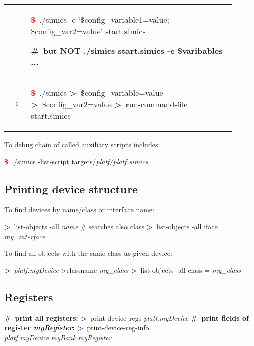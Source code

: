\documentclass[8pt]{extarticle}
\newenvironment{code}[1][]{%
\begin{prebox}[#1]\obeylines}{%
\end{prebox}}
\newenvironment{codem}[1][\linewidth]{%
\begin{minipage}{#1}%
\begin{prebox}\obeylines}{%
\end{prebox}%
\end{minipage}}
\newenvironment{code9}{\begin{codem}[0.9\linewidth]}{\end{codem}}
\newcommand{\cod}[1]{\colorbox{green!15}{#1}}
\newcommand{\ind}{\hphantom{~~~}}
\newcommand{\prompt}{\textcolor{red}{\textbf{\$}\ }}
\newcommand{\sprompt}{\textcolor{blue}{\textbf{>}\ }}
\newcommand{\cmt}[1]{\textcolor{Sepia}{\textbf{\#\ #1}}}
\newcommand{\p}[1]{\textit{\large#1}}
\begin{document}
\begin{multicols*}{3}
\begin{tabular}{lp{0.9\linewidth}}
        & \begin{code9}
            \prompt ./simics -e ‘\$config\_variable1=value; \$config\_var2=value’ start.simics

            \cmt{but NOT ./simics start.simics -e \$varibables ...}
        \end{code9}
        \vspace{0.05cm}
        \\
        $\longrightarrow$ &
        \begin{code9}
            \prompt ./simics
            \sprompt \$config\_variable=value
            \sprompt \$config\_var2=value
            \sprompt run-command-file start.simics
        \end{code9}
    \end{tabular}


    To debug chain of called auxiliary scripts \cod{include}s:
    \begin{code}
        \prompt ./simics -list-script targets/\p{platf/platf.simics}
    \end{code}

\subsection{Printing device structure}
To find devices by name/class or interface name:
    \begin{code}
        \sprompt list-objects -all \p{name} \ind \# searches also class
        \sprompt list-objects -all iface = \p{my\_interface}
    \end{code}

To find all objects with the same class as given device:
        \begin{code}
            \sprompt \p{platf.myDevice}->classname
            \p{my\_class}
            \sprompt list-objects -all class = \p{my\_class}
        \end{code}

\subsection{Registers}
\begin{code}
    \cmt{print all registers:}
    \sprompt print-device-regs \p{platf.myDevice}
    \cmt{print fields of register \p{myRegister}:}
    \sprompt print-device-reg-info \p{platf.myDevice.myBank.myRegister}
\end{code}


\end{multicols*}
\end{document}
